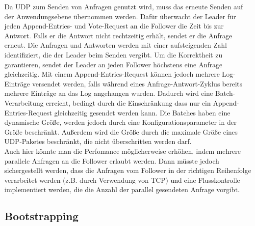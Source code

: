 Da UDP zum Senden von Anfragen genutzt wird, muss das erneute Senden auf der Anwendungsebene übernommen werden. Dafür überwacht der Leader für jeden Append-Entries- und Vote-Request an die Follower die Zeit bis zur Antwort. Falls er die Antwort nicht rechtzeitig erhält, sendet er die Anfrage erneut. Die Anfragen und Antworten werden mit einer aufsteigenden Zahl identifiziert, die der Leader beim Senden vergibt. Um die Korrektheit zu garantieren, sendet der Leader an jeden Follower höchstens eine Anfrage gleichzeitig. Mit einem Append-Entries-Request können jedoch mehrere Log-Einträge versendet werden, falls während eines Anfrage-Antwort-Zyklus bereits mehrere Einträge an das Log angehangen wurden. Dadurch wird eine Batch-Verarbeitung erreicht, bedingt durch die Einschränkung dass nur ein Append-Entries-Request gleichzeitig gesendet werden kann. Die Batches haben eine dynamische Größe, werden jedoch durch eine Konfigurationsparameter in der Größe beschränkt. Außerdem wird die Größe durch die maximale Größe eines UDP-Paketes beschränkt, die nicht überschritten werden darf.\\
Auch hier könnte man die Perfomance möglicherweise erhöhen, indem mehrere parallele Anfragen an die Follower erlaubt werden. Dann müsste jedoch sichergestellt werden, dass die Anfragen vom Follower in der richtigen Reihenfolge verarbeitet werden (z.B. durch Verwendung von TCP) und eine Flusskontrolle implementiert werden, die die Anzahl der parallel gesendeten Anfrage vorgibt.

\subsection{Bootstrapping}

